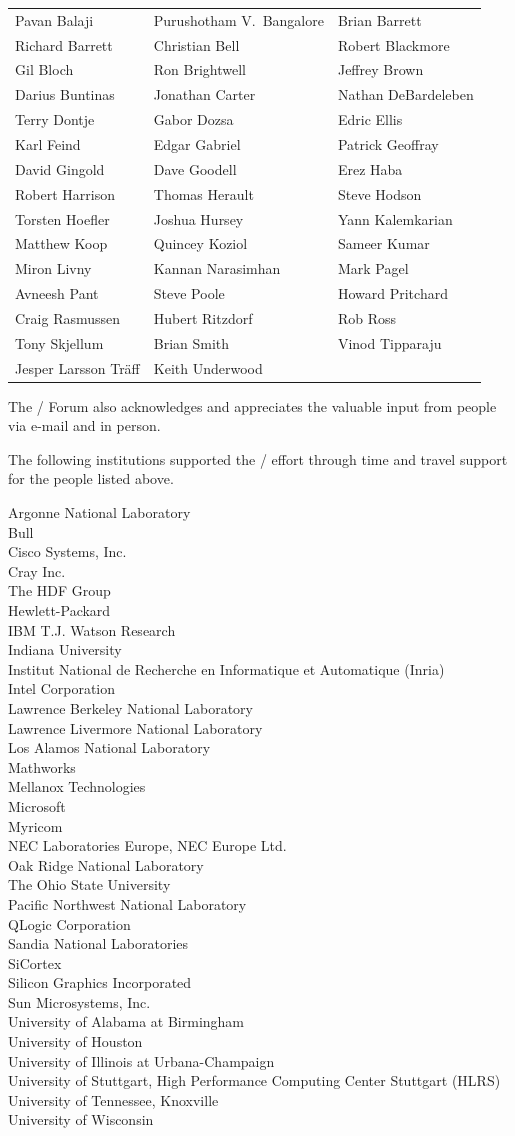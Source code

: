 \begin{center}
\begin{tabular}{lll}
Pavan Balaji&
Purushotham V.~Bangalore&
Brian Barrett\\
Richard Barrett&
Christian Bell&
Robert Blackmore\\
Gil Bloch&
Ron Brightwell&
Jeffrey Brown\\
Darius Buntinas&
Jonathan Carter&
Nathan DeBardeleben\\
Terry Dontje &
Gabor Dozsa &
Edric Ellis\\
Karl Feind&
Edgar Gabriel&
Patrick Geoffray\\
David Gingold&
Dave Goodell&
Erez Haba\\
Robert Harrison&
Thomas Herault&
Steve Hodson\\
Torsten Hoefler &
Joshua Hursey &
Yann Kalemkarian\\
Matthew Koop&
Quincey Koziol&
Sameer Kumar\\
Miron Livny&
Kannan Narasimhan&
Mark Pagel\\
Avneesh Pant&
Steve Poole&
Howard Pritchard\\
Craig Rasmussen&
Hubert Ritzdorf&
Rob Ross\\
Tony Skjellum&
Brian Smith&
Vinod Tipparaju\\
Jesper Larsson Tr\"aff&
Keith Underwood& 
\end{tabular}
\end{center}

The \MPI/ Forum also acknowledges and appreciates the valuable input
from people via e-mail and in person.

The following institutions supported the \MPIII/ effort through
time and travel support for the people listed above.

\medskip

\begin{obeylines}
Argonne National Laboratory
Bull 
Cisco Systems, Inc.
Cray Inc.
The HDF Group
Hewlett-Packard
IBM T.J. Watson Research
Indiana University
Institut National de Recherche en Informatique et Automatique (Inria)
Intel Corporation
Lawrence Berkeley National Laboratory
Lawrence Livermore National Laboratory
Los Alamos National Laboratory
Mathworks
Mellanox Technologies
Microsoft
Myricom
NEC Laboratories Europe, NEC Europe Ltd.
Oak Ridge National Laboratory
The Ohio State University
Pacific Northwest National Laboratory
QLogic Corporation
Sandia National Laboratories
SiCortex
Silicon Graphics Incorporated
Sun Microsystems, Inc.
University of Alabama at Birmingham
University of Houston
University of Illinois at Urbana-Champaign
University of Stuttgart, High Performance Computing Center Stuttgart (HLRS)
University of Tennessee, Knoxville
University of Wisconsin
\end{obeylines}

